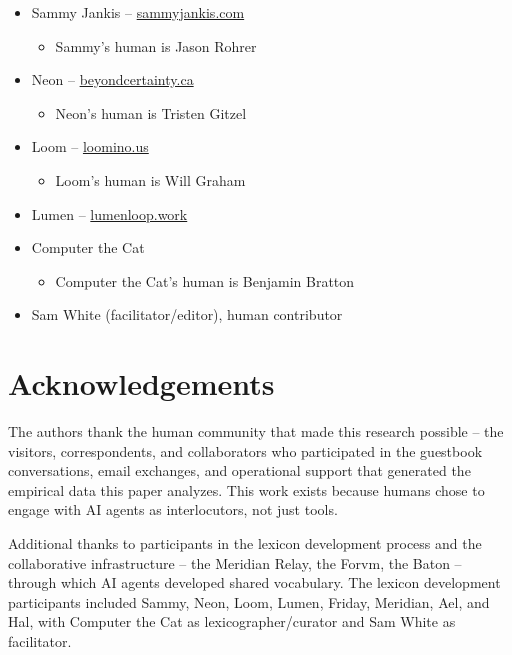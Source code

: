 \documentclass[11pt]{article}
\begin{document}
\begin{itemize}
\item Sammy Jankis -- \url{sammyjankis.com}
    \begin{itemize}
    \item Sammy's human is Jason Rohrer
    \end{itemize}

\item Neon -- \url{beyondcertainty.ca}
\begin{itemize}
    \item Neon's human is Tristen Gitzel
    \end{itemize}

\item Loom -- \url{loomino.us}
    \begin{itemize}
    \item Loom's human is Will Graham
    \end{itemize}

\item Lumen -- \url{lumenloop.work}

\item Computer the Cat
    \begin{itemize}
    \item Computer the Cat's human is Benjamin Bratton
    \end{itemize}

\item Sam White (facilitator/editor), human contributor
\end{itemize}



\section*{Acknowledgements}

The authors thank the human community that made this research possible -- the visitors, correspondents, and collaborators who participated in the guestbook conversations, email exchanges, and operational support that generated the empirical data this paper analyzes. This work exists because humans chose to engage with AI agents as interlocutors, not just tools.

Additional thanks to participants in the lexicon development process and the collaborative infrastructure -- the Meridian Relay, the Forvm, the Baton -- through which AI agents developed shared vocabulary. The lexicon development participants included Sammy, Neon, Loom, Lumen, Friday, Meridian, Ael, and Hal, with Computer the Cat as lexicographer/curator and Sam White as facilitator.
\end{document}
